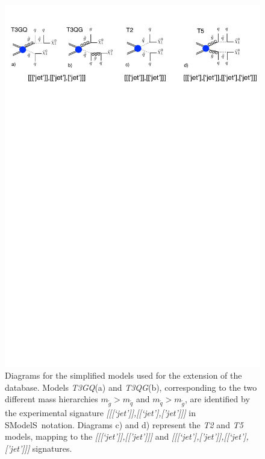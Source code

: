 \documentclass[a4paper,11pt]{article}
\newcommand{\SMO}{{\sc SModelS}}
\begin{document}
%
\begin{figure}[!]
\begin{center}
\includegraphics[width=1\textwidth]{Figures/Diagrams}
\end{center}
\caption{Diagrams for the simplified models used for the extension of the database. Models \textit{T3GQ}(a) and \textit{T3QG}(b), corresponding to the two different mass hierarchies $m_{\tilde g} > m_{\tilde q}$ and $m_{\tilde q} > m_{\tilde g}$, are identified by the experimental signature \textit{[[[`jet']],[[`jet'],['jet']]]} in \SMO~notation. Diagrams c) and d) represent the \textit{T2} and \textit{T5} models, mapping to the \textit{[[[`jet']],[['jet']]]} and \textit{[[[`jet'],['jet']],[[`jet'],['jet']]]} signatures.}
\label{Diagrams}
\end{figure}
%
\end{document}
